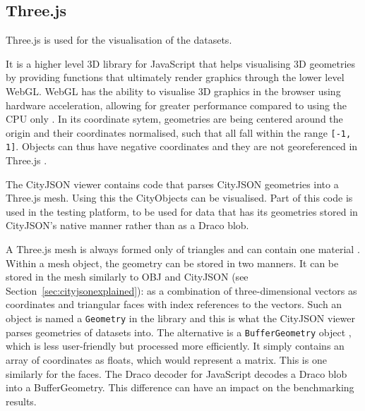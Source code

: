 \subsection{Three.js}
\label{sec:threejsmesh}

Three.js \citep{Three.js2020} is used for the visualisation of the datasets.

It is a higher level 3D library for JavaScript that helps visualising 3D geometries by providing functions that ultimately render graphics through the lower level WebGL.
WebGL has the ability to visualise 3D graphics in the browser using hardware acceleration, allowing for greater performance compared to using the CPU only \citep{WebGL2011}.
In its coordinate sytem, geometries are being centered around the origin and their coordinates normalised, such that all fall within the range \texttt{[-1, 1]}.
Objects can thus have negative coordinates and they are not georeferenced in Three.js \citep{Three.js2020}.

The CityJSON viewer \citep{Boersma2019} contains code that parses CityJSON geometries into a Three.js mesh.
Using this the CityObjects can be visualised. 
Part of this code is used in the testing platform, to be used for data that has its geometries stored in CityJSON's native manner rather than as a Draco blob.

A Three.js mesh is always formed only of triangles and can contain one material \citep{Three.js2020a}.
Within a mesh object, the geometry can be stored in two manners.
It can be stored in the mesh similarly to OBJ and CityJSON (see Section~\ref{sec:cityjsonexplained}): as a combination of three-dimensional vectors as coordinates and triangular faces with index references to the vectors.
Such an object is named a \texttt{Geometry} in the library and this is what the CityJSON viewer parses geometries of datasets into.
The alternative is a \texttt{BufferGeometry} object \citep{Three.js2020b}, which is less user-friendly but processed more efficiently.
It simply contains an array of coordinates as floats, which would represent a matrix.
This is one similarly for the faces.
The Draco decoder for JavaScript decodes a Draco blob into a BufferGeometry.
This difference can have an impact on the benchmarking results.







